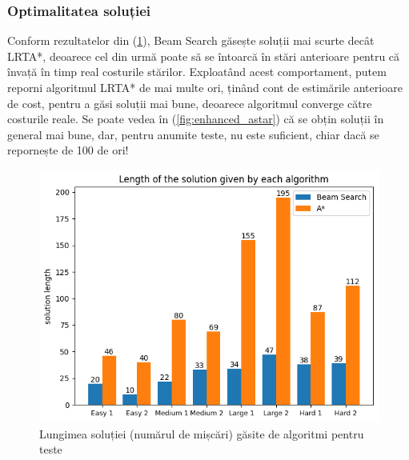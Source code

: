 \documentclass{article}
\begin{document}
\subsubsection*{Optimalitatea soluției}
Conform rezultatelor din (\ref{fig:solution_length}), Beam Search găsește 
soluții mai scurte decât LRTA*, deoarece cel din urmă poate să se întoarcă în 
stări anterioare pentru că învață în timp real costurile stărilor. Exploatând 
acest comportament, putem reporni algoritmul LRTA* de mai multe ori, ținând cont
de estimările anterioare de cost, pentru a găsi soluții mai bune, deoarece
algoritmul converge către costurile reale. Se poate vedea în 
(\ref{fig:enhanced_astar}) că se obțin soluții în general mai bune, dar, pentru
anumite teste, nu este suficient, chiar dacă se repornește de 100 de ori!

\begin{figure}
    \includegraphics[scale=0.8]{plots/solution/solution_length.png}
    \caption{Lungimea soluției (numărul de mișcări) găsite de algoritmi pentru 
    teste}
    \label{fig:solution_length}
\end{figure}
\end{document}
